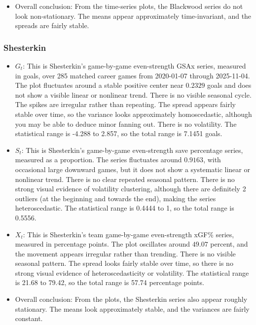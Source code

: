 \documentclass[
  10pt,
]{extarticle}
\providecommand{\tightlist}{%
  \setlength{\itemsep}{0pt}\setlength{\parskip}{0pt}}
\begin{document}
\begin{itemize}
\item
  Overall conclusion: From the time-series plots, the Blackwood series do not look non-stationary. The means appear approximately time-invariant, and the spreads are fairly stable.
\end{itemize}

\subsubsection{Shesterkin}\label{shesterkin}

\begin{itemize}
\tightlist
\item
  \(G_t\): This is Shesterkin's game-by-game even-strength GSAx series, measured in goals, over 285 matched career games from 2020-01-07 through 2025-11-04. The plot fluctuates around a stable positive center near \(0.2329\) goals and does not show a visible linear or nonlinear trend. There is no visible seasonal cycle. The spikes are irregular rather than repeating. The spread appears fairly stable over time, so the variance looks approximately homoscedastic, although you may be able to deduce minor fanning out. There is no volatility. The statistical range is -4.288 to 2.857, so the total range is 7.1451 goals.
\item
  \(S_t\): This is Shesterkin's game-by-game even-strength save percentage series, measured as a proportion. The series fluctuates around \(0.9163\), with occasional large downward games, but it does not show a systematic linear or nonlinear trend. There is no clear repeated seasonal pattern. There is no strong visual evidence of volatility clustering, although there are definitely 2 outliers (at the beginning and towards the end), making the series heteroscedastic. The statistical range is 0.4444 to 1, so the total range is 0.5556.
\item
  \(X_t\): This is Shesterkin's team game-by-game even-strength xGF\% series, measured in percentage points. The plot oscillates around \(49.07\) percent, and the movement appears irregular rather than trending. There is no visible seasonal pattern. The spread looks fairly stable over time, so there is no strong visual evidence of heteroscedasticity or volatility. The statistical range is 21.68 to 79.42, so the total range is 57.74 percentage points.
\item
  Overall conclusion: From the plots, the Shesterkin series also appear roughly stationary. The means look approximately stable, and the variances are fairly constant.
\end{itemize}
\end{document}
